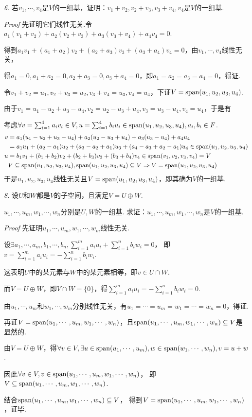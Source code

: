 \textit{6.}
若\(v_1,\cdots,v_4\)是\(V\)的一组基，证明：\(v_1+v_2,v_2+v_3,v_3+v_4,v_4\)是\(V\)的一组基.

\textit{Proof}
先证明它们线性无关.令\(a_1(v_1+v_2)+a_2(v_2+v_3)+a_3(v_3+v_4)+a_4v_4=0\).

得到\(a_1v_1+(a_1+a_2)v_2+(a_2+a_3)v_3+(a_3+a_4)v_4=0\)，由\(v_1,\cdots,v_4\)线性无关，

得\(a_1=0,a_1+a_2=0,a_2+a_3=0,a_3+a_4=0\)，即\(a_1=a_2=a_3=a_4=0\)，得证.

令\(v_1+v_2=u_1,v_2+v_3=u_2,v_3+v_4=u_3,v_4=u_4\)，下证\(V=\mathrm{span}(u_1,u_2,u_3,u_4)\).

由于\(v_1=u_1-u_2+u_3-u_4,v_2=u_2-u_3+u_4,v_3=u_3-u_4,v_4=u_4\)，于是有

考虑\(\forall v=\sum_{i=1}^4 a_iv_i \in V,u=\sum_{i=1}^4 b_iu_i \in \mathrm{span}(u_1,u_2,u_3,u_4),a_i,b_i \in F\).
    \begin{align*}
        v&=a_1(u_1-u_2+u_3-u_4)+a_2(u_2-u_3+u_4)+a_3(u_3-u_4)+a_4u_4 \\
         &=a_1u_1+(a_2-a_1)u_2+(a_3-a_2+a_1)u_3+(a_4-a_3+a_2-a_1)u_4 \in \mathrm{span}(u_1,u_2,u_3,u_4) \\
        u&=b_1v_1+(b_1+b_2)v_2+(b_2+b_3)v_3+(b_3+b_4)v_4 \in \mathrm{span}(v_1,v_2,v_3,v_4)=V \\
        & V \subseteq \mathrm{span}(u_1,u_2,u_3,u_4),\mathrm{span}(u_1,u_2,u_3,u_4)\subseteq V 
        \Rightarrow V=\mathrm{span}(u_1,u_2,u_3,u_4)
    \end{align*}
于是\(u_1,u_2,u_3,u_4\)线性无关且\(V=\mathrm{span}(u_1,u_2,u_3,u_4)\)，即其确为\(V\)的一组基.

\hspace*{\fill}

\textit{8.}
设\(U\)和\(W\)都是\(V\)的子空间，且满足\(V=U \oplus W\).

\(u_1,\cdots,u_m,w_1,\cdots,w_n\)分别是\(U,W\)的一组基.
求证：\(u_1,\cdots,u_m,w_1,\cdots,w_n\)是\(V\)的一组基.

\textit{Proof}
先证明\(u_1,\cdots,u_m,w_1,\cdots,w_m\)线性无关.

设\(\exists a_1,\cdots,a_m,b_1,\cdots,b_n,\sum_{i=1}^m a_iu_i+\sum_{i=1}^n b_iw_i=0\)，
即\(v=\sum_{i=1}^m a_iu_i=-\sum_{i=1}^n b_iw_i\).

这表明\(U\)中的某元素与\(W\)中的某元素相等，即\(v\in U\cap W\).

而\(V=U\oplus W\)，即\(V\cap W=\{0\}\)，得\(\sum_{i=1}^m a_iu_i=-\sum_{i=1}^n b_iw_i=0\).

由\(u_1,\cdots,u_m\)和\(w_1,\cdots,w_m\)分别线性无关，有\(u_1=\cdots=u_m=w_1=\cdots=w_n=0\)，得证.

再证\(V=\mathrm{span}(u_1,\cdots,u_m,w_1,\cdots,w_n)\)，且\(\mathrm{span}(u_1,\cdots,u_m,w_1,\cdots,w_n) \subseteq V\)是显然的.

由\(V=U\oplus W\)，得\(\forall v\in V,\exists u \in \mathrm{span}(u_1,\cdots,u_m),w \in \mathrm{span}(w_1,\cdots,w_n),v=u+w\).

因此\(\forall v \in V,v \in \mathrm{span} (u_1,\cdots,u_m,w_1,\cdots,w_n)\)，
即\(V \subseteq \mathrm{span}(u_1,\cdots,u_m,w_1,\cdots,w_n)\).

结合\(\mathrm{span}(u_1,\cdots,u_m,w_1,\cdots,w_n) \subseteq V\)，
得到\(V=\mathrm{span} (u_1,\cdots,u_m,w_1,\cdots,w_n)\)，证毕.


